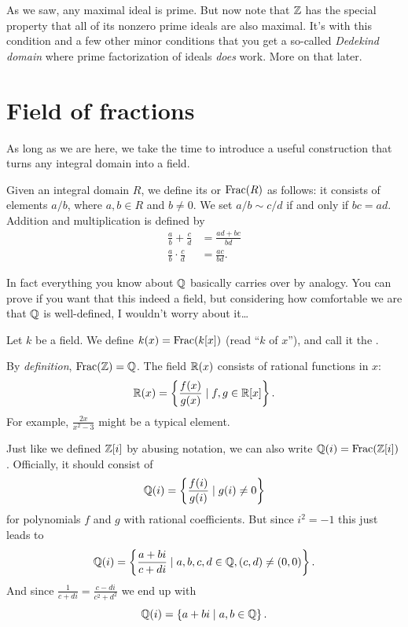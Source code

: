 As we saw, any maximal ideal is prime.
But now note that $\mathbb Z$ has the special property that
all of its nonzero prime ideals are also maximal.
It's with this condition and a few other minor conditions
that you get a so-called \emph{Dedekind domain}
where prime factorization of ideals \emph{does} work.
More on that later.

\section{Field of fractions}
As long as we are here, we take the time to introduce a useful
construction that turns any integral domain into a field.

\begin{definition}
	Given an integral domain $R$,
	we define its  or 
	$\operatorname{Frac}(R)$ as follows:
	it consists of elements $a / b$, where $a,b \in R$ and $b \neq 0$.
	We set $a / b \sim c / d$ if and only if $bc = ad$.
	Addition and multiplication is defined by
	\begin{align*}
		\frac ab + \frac cd &= \frac{ad+bc}{bd} \\
		\frac ab \cdot \frac cd &= \frac{ac}{bd}.
	\end{align*}
\end{definition}
In fact everything you know about $\mathbb Q$ basically carries over by analogy.
You can prove if you want that this indeed a field, but
considering how comfortable we are that $\mathbb Q$ is well-defined,
I wouldn't worry about it\dots

\begin{definition}
	Let $k$ be a field.
	We define $k(x) = \operatorname{Frac}(k[x])$
	(read ``$k$ of $x$''),
	and call it the .
\end{definition}

\begin{example}
	\listhack
	\begin{enumerate}[(a)]
		\ii By \emph{definition}, $\operatorname{Frac}(\mathbb Z) = \mathbb Q$.
		\ii The field $\mathbb R(x)$ consists of rational functions in $x$:
		\[ \mathbb R(x) = \left\{ \frac{f(x)}{g(x)} \mid f,g \in \mathbb R[x] \right\}. \]
		For example, $\frac{2x}{x^2-3}$ might be a typical element.
	\end{enumerate}
\end{example}

\begin{example}
	\label{ex:gaussian_rationals}
	Just like we defined $\mathbb Z[i]$ by abusing notation,
	we can also write $\mathbb Q(i) = \operatorname{Frac}(\mathbb Z[i])$.
	Officially, it should consist of
	\[ \mathbb Q(i) = \left\{ \frac{f(i)}{g(i)} \mid g(i) \neq 0 \right\} \]
	for polynomials $f$ and $g$ with rational coefficients.
	But since $i^2=-1$ this just leads to
	\[ \mathbb Q(i) = \left\{ \frac{a+bi}{c+di} \mid a,b,c,d \in \mathbb Q,
		(c,d) \neq (0,0) \right\}. \]
	And since $\frac{1}{c+di} = \frac{c-di}{c^2+d^2}$ we end up with
	\[ \mathbb Q(i) = \left\{ a+bi \mid a,b \in \mathbb Q \right\}. \]
\end{example}


